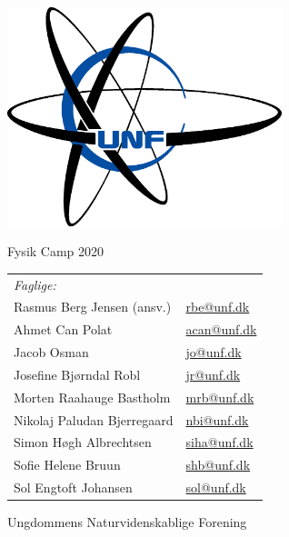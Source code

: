 \newcommand{\campyear}{2020}%
\frontmatter
{}%

\begin{center}
\includegraphics[width = 8cm]{setup/Unflogo.eps}
\vspace{1cm}

{\fontsize{24pt}{28pt}\selectfont
Fysik Camp \campyear}

\vspace{3cm}
\begin{tabular}{ll}
      \textit{Faglige:} & \\
      Rasmus Berg Jensen (ansv.)	& \href{mailto:rbe@unf.dk}{rbe@unf.dk} \\
      Ahmet Can Polat		& \href{mailto:acan@unf.dk}{acan@unf.dk} \\
      Jacob Osman		& \href{mailto:jo@unf.dk}{jo@unf.dk} \\
      Josefine Bjørndal Robl		& \href{mailto:jr@unf.dk}{jr@unf.dk} \\
      Morten Raahauge Bastholm		& \href{mailto:mrb@unf.dk}{mrb@unf.dk} \\
      Nikolaj Paludan Bjerregaard		& \href{mailto:nbi@unf.dk}{nbi@unf.dk} \\
      Simon Høgh Albrechtsen		& \href{mailto:siha@unf.dk}{siha@unf.dk} \\
      Sofie Helene Bruun			& \href{mailto:shb@unf.dk}{shb@unf.dk} \\
      Sol Engtoft Johansen		& \href{sol@unf.dk}{sol@unf.dk} \\
    \end{tabular}

\vfill
{\fontsize{16pt}{28pt}\selectfont
Ungdommens Naturvidenskablige Forening}
\end{center}
\newpage
\hspace{1cm}%
\vfill

